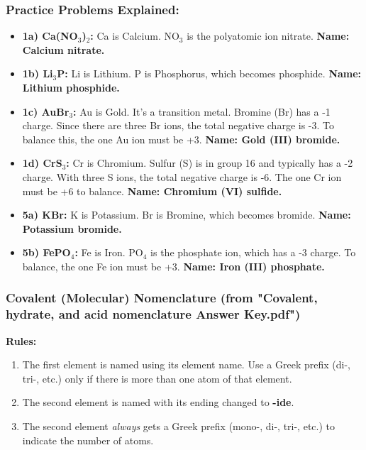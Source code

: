 \documentclass{article}
\begin{document}
\subsubsection*{Practice Problems Explained:}
\begin{itemize}[itemsep=5pt]
    \item \textbf{1a) Ca(NO$_3$)$_2$:} Ca is Calcium. NO$_3$ is the polyatomic ion nitrate. \textbf{Name: Calcium nitrate.}
    \item \textbf{1b) Li$_3$P:} Li is Lithium. P is Phosphorus, which becomes phosphide. \textbf{Name: Lithium phosphide.}
    \item \textbf{1c) AuBr$_3$:} Au is Gold. It's a transition metal. Bromine (Br) has a -1 charge. Since there are three Br ions, the total negative charge is -3. To balance this, the one Au ion must be +3. \textbf{Name: Gold (III) bromide.}
    \item \textbf{1d) CrS$_3$:} Cr is Chromium. Sulfur (S) is in group 16 and typically has a -2 charge. With three S ions, the total negative charge is -6. The one Cr ion must be +6 to balance. \textbf{Name: Chromium (VI) sulfide.}
    \item \textbf{5a) KBr:} K is Potassium. Br is Bromine, which becomes bromide. \textbf{Name: Potassium bromide.}
    \item \textbf{5b) FePO$_4$:} Fe is Iron. PO$_4$ is the phosphate ion, which has a -3 charge. To balance, the one Fe ion must be +3. \textbf{Name: Iron (III) phosphate.}
\end{itemize}

\subsubsection*{Covalent (Molecular) Nomenclature (from "Covalent, hydrate, and acid nomenclature Answer Key.pdf")}
\textbf{Rules:}
\begin{enumerate}[itemsep=5pt]
    \item The first element is named using its element name. Use a Greek prefix (di-, tri-, etc.) only if there is more than one atom of that element.
    \item The second element is named with its ending changed to \textbf{-ide}.
    \item The second element \textit{always} gets a Greek prefix (mono-, di-, tri-, etc.) to indicate the number of atoms.
\end{enumerate}
\end{document}
